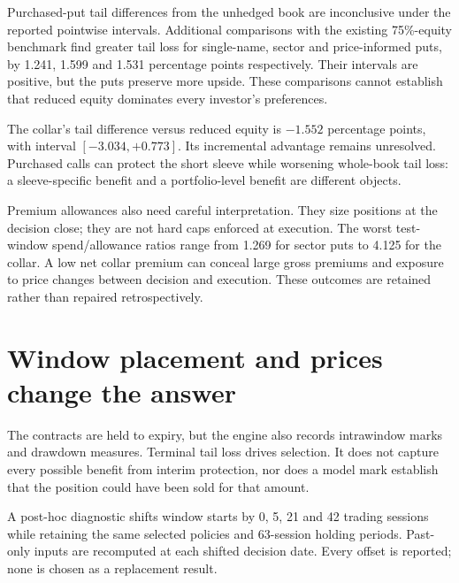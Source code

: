 \documentclass[11pt,a4paper]{article}
\begin{document}

Purchased-put tail differences from the unhedged book are inconclusive under the reported pointwise intervals. Additional comparisons with the existing 75\%-equity benchmark find greater tail loss for single-name, sector and price-informed puts, by 1.241, 1.599 and 1.531 percentage points respectively. Their intervals are positive, but the puts preserve more upside. These comparisons cannot establish that reduced equity dominates every investor's preferences.

The collar's tail difference versus reduced equity is $-1.552$ percentage points, with interval $[-3.034,+0.773]$. Its incremental advantage remains unresolved. Purchased calls can protect the short sleeve while worsening whole-book tail loss: a sleeve-specific benefit and a portfolio-level benefit are different objects.

Premium allowances also need careful interpretation. They size positions at the decision close; they are not hard caps enforced at execution. The worst test-window spend/allowance ratios range from 1.269 for sector puts to 4.125 for the collar. A low net collar premium can conceal large gross premiums and exposure to price changes between decision and execution. These outcomes are retained rather than repaired retrospectively.

\nextpage
\section*{Window placement and prices change the answer}
The contracts are held to expiry, but the engine also records intrawindow marks and drawdown measures. Terminal tail loss drives selection. It does not capture every possible benefit from interim protection, nor does a model mark establish that the position could have been sold for that amount.

A post-hoc diagnostic shifts window starts by 0, 5, 21 and 42 trading sessions while retaining the same selected policies and 63-session holding periods. Past-only inputs are recomputed at each shifted decision date. Every offset is reported; none is chosen as a replacement result.

\end{document}
